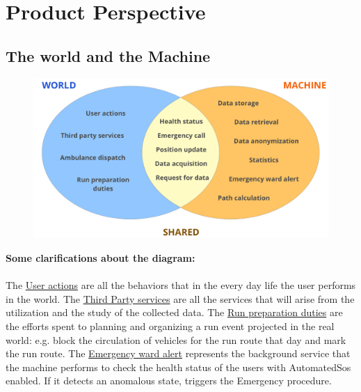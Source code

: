 \section{Product Perspective}
\subsection{The world and the Machine}
\begin{figure}[H]
    \centering
    \includegraphics[scale=0.3]{rasdL/Pictures/worldmachine.png}

\end{figure}

\textbf{Some clarifications about the diagram:}\\ \\
The \underline{User actions} are all the behaviors that in the every day life the user performs in the world. The \underline{Third Party services} are all the services that will arise from the utilization and the study of the collected data. The \underline{Run preparation duties} are the efforts spent to planning and organizing a run event projected in the real world: e.g. block the circulation of vehicles for the run route that day and mark the run route. The \underline{Emergency ward alert} represents the background service that the machine performs to check the health status
of the users with AutomatedSos enabled. If it detects an anomalous state, triggers the Emergency procedure.

\newpage
